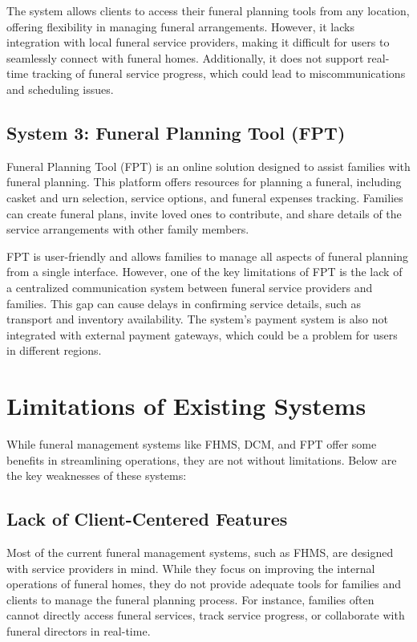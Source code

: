 \documentclass[a4paper,12pt]{report}
\begin{document}
The system allows clients to access their funeral planning tools from any location, offering flexibility in managing funeral arrangements. However, it lacks integration with local funeral service providers, making it difficult for users to seamlessly connect with funeral homes. Additionally, it does not support real-time tracking of funeral service progress, which could lead to miscommunications and scheduling issues.

\subsection{System 3: Funeral Planning Tool (FPT)}
Funeral Planning Tool (FPT) is an online solution designed to assist families with funeral planning. This platform offers resources for planning a funeral, including casket and urn selection, service options, and funeral expenses tracking. Families can create funeral plans, invite loved ones to contribute, and share details of the service arrangements with other family members.

FPT is user-friendly and allows families to manage all aspects of funeral planning from a single interface. However, one of the key limitations of FPT is the lack of a centralized communication system between funeral service providers and families. This gap can cause delays in confirming service details, such as transport and inventory availability. The system’s payment system is also not integrated with external payment gateways, which could be a problem for users in different regions.

\section{Limitations of Existing Systems}
While funeral management systems like FHMS, DCM, and FPT offer some benefits in streamlining operations, they are not without limitations. Below are the key weaknesses of these systems:

\subsection{Lack of Client-Centered Features}
Most of the current funeral management systems, such as FHMS, are designed with service providers in mind. While they focus on improving the internal operations of funeral homes, they do not provide adequate tools for families and clients to manage the funeral planning process. For instance, families often cannot directly access funeral services, track service progress, or collaborate with funeral directors in real-time.
\end{document}
